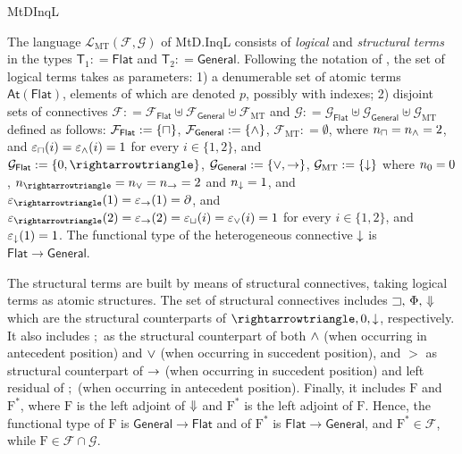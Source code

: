 \begin{entry}{MtDInqL}
\begin{clarifications}
The language $\mathcal{L}_\mathrm{MT}(\mathcal{F}, \mathcal{G})$ of  MtD.InqL consists of  {\em logical}   and {\em structural terms} in the types $\mathsf{T}_1:  = \mathsf{Flat}$ and $\mathsf{T}_2: = \mathsf{General}$. Following the notation of , the set  of logical terms takes as parameters: 1) a denumerable  set of atomic terms $\mathsf{At}(\mathsf{Flat})$, elements of which are denoted $p$, possibly with indexes; 2) disjoint sets of connectives $\mathcal{F}: = \mathcal{F}_{\mathsf{Flat}}\uplus\mathcal{F}_{\mathsf{General}}\uplus\mathcal{F}_{\mathrm{MT}}$ and $\mathcal{G}: = \mathcal{G}_{\mathsf{Flat}}\uplus\mathcal{G}_{\mathsf{General}}\uplus\mathcal{G}_{\mathrm{MT}}$ defined as follows: 
$\mathcal{F}_{\mathsf{Flat}}: = \{\sqcap\}$, $\mathcal{F}_{\mathsf{General}}: = \{\wedge \}$, $\mathcal{F}_{\mathrm{MT}}: = \emptyset$, where  $n_\sqcap = n_\wedge = 2$,   and $\varepsilon_{\sqcap}(i) = \varepsilon_{\wedge}(i) = 1$ for every $i\in \{1, 2\}$, and
$\mathcal{G}_{\mathsf{Flat}}: = \{\cbot, \cra\}$, $\mathcal{G}_{\mathsf{General}}: = \{\vee,\to \}$, $\mathcal{G}_{\mathrm{MT}}: = \{{\downarrow}\}$ where  $n_0 = 0$, $n_\cra = n_\ior = n_{\ira} =  2$  and $n_{{\downarrow}} = 1$,  and $\varepsilon_{\cra}(1) = \varepsilon_{\ira}(1) = \partial$, and $\varepsilon_{\cra}(2) = \varepsilon_{\ira}(2) = \varepsilon_{\cor}(i) = \varepsilon_{\ior}(i) = 1$ for every $i\in \{1, 2\}$, and $\varepsilon_{{\downarrow}}(1) = 1$. The functional type of the heterogeneous connective ${\downarrow}$ is $\mathsf{Flat}\rightarrow \mathsf{General}$.

The structural terms are built by means of structural connectives, taking logical terms as atomic structures. The set of structural connectives includes  $\sqsupset,\, \Phi,\, {\Downarrow}$   which are the structural counterparts of $\cra, \cbot, \bh$, respectively.  It also includes $;$  as the structural counterpart of both $\wedge$ (when occurring in antecedent position) and $\vee$ (when occurring in succedent position), and $>$ as structural counterpart of  $\to$ (when occurring in succedent position) and left residual of $;$ (when occurring in antecedent position).
 Finally, it includes $\mathrm{F}$ and $\mathrm{F}^\ast$, where $\mathrm{F}$ is the left adjoint of ${\Downarrow}$ and  $\mathrm{F}^\ast$ is the left  adjoint of $\mathrm{F}$. Hence, the functional type of $\mathrm{F}$ is $\mathsf{General}\rightarrow \mathsf{Flat}$ and of $\mathrm{F}^\ast$ is $\mathsf{Flat}\rightarrow \mathsf{General}$, and  $\mathrm{F}^\ast\in \mathcal{F}$, while $\mathrm{F}\in \mathcal{F}\cap \mathcal{G}$. 


\end{clarifications}
\end{entry}
